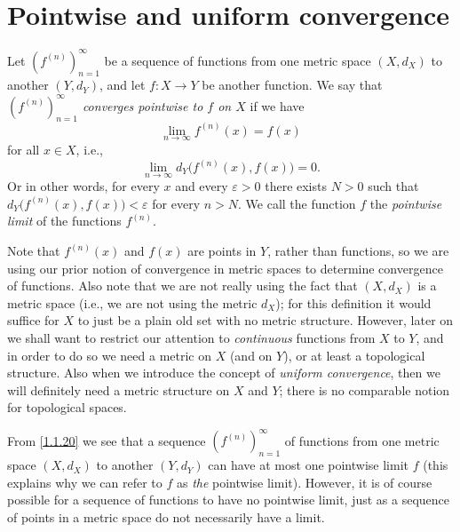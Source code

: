 \section{Pointwise and uniform convergence}\label{sec:3.2}

\begin{defn}\label{3.2.1}
  Let \((f^{(n)})_{n = 1}^\infty\) be a sequence of functions from one metric space \((X, d_X)\) to another \((Y, d_Y)\), and let \(f : X \to Y\) be another function.
  We say that \emph{\((f^{(n)})_{n = 1}^\infty\) converges pointwise to \(f\) on \(X\)} if we have
  \[
    \lim_{n \to \infty} f^{(n)}(x) = f(x)
  \]
  for all \(x \in X\), i.e.,
  \[
    \lim_{n \to \infty} d_Y\big(f^{(n)}(x), f(x)\big) = 0.
  \]
  Or in other words, for every \(x\) and every \(\varepsilon > 0\) there exists \(N > 0\) such that \(d_Y\big(f^{(n)}(x), f(x)\big) < \varepsilon\) for every \(n > N\).
  We call the function \(f\) the \emph{pointwise limit} of the functions \(f^{(n)}\).
\end{defn}

\begin{rmk}\label{3.2.2}
  Note that \(f^{(n)}(x)\) and \(f(x)\) are points in \(Y\), rather than functions, so we are using our prior notion of convergence in metric spaces to determine convergence of functions.
  Also note that we are not really using the fact that \((X, d_X)\) is a metric space
  (i.e., we are not using the metric \(d_X\));
  for this definition it would suffice for \(X\) to just be a plain old set with no metric structure.
  However, later on we shall want to restrict our attention to \emph{continuous} functions from \(X\) to \(Y\), and in order to do so we need a metric on \(X\) (and on \(Y\)), or at least a topological structure.
  Also when we introduce the concept of \emph{uniform convergence}, then we will definitely need a metric structure on \(X\) and \(Y\);
  there is no comparable notion for topological spaces.
\end{rmk}

\begin{note}
  From \cref{1.1.20} we see that a sequence \((f^{(n)})_{n = 1}^\infty\) of functions from one metric space \((X, d_X)\) to another \((Y, d_Y)\) can have at most one pointwise limit \(f\)
  (this explains why we can refer to \(f\) as \emph{the} pointwise limit).
  However, it is of course possible for a sequence of functions to have no pointwise limit, just as a sequence of points in a metric space do not necessarily have a limit.
\end{note}


